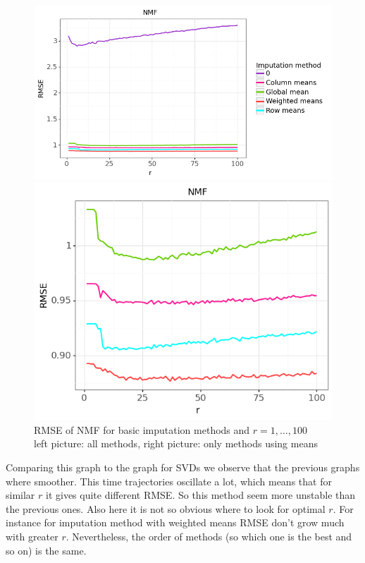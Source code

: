 \documentclass[10pt]{amsart}
\begin{document}
\begin{figure}[H]
\centering
\begin{minipage}{.63\textwidth}
  \centering
  \includegraphics[width=\textwidth]{nmf_1}
\end{minipage}%
\begin{minipage}{.4\textwidth}
  \centering
  \includegraphics[width=\textwidth]{nmf_2}
\end{minipage}
\caption{RMSE of NMF for basic imputation methods and $r = 1, \dots, 100$\\
left picture: all methods, right picture: only methods using means}
\end{figure}

Comparing this graph to the graph for SVDs we observe that the previous graphs where smoother.
This time trajectories oscillate a lot, which means that for similar $r$ it gives quite different RMSE.
So this method seem more unstable than the previous ones.
Also here it is not so obvious where to look for optimal $r$.
For instance for imputation method with weighted means RMSE don't grow much with greater $r$.
Nevertheless, the order of methods (so which one is the best and so on) is the same.
\end{document}
